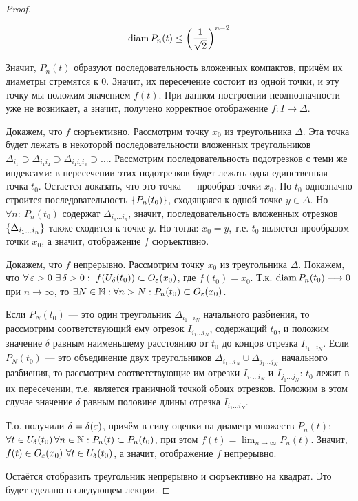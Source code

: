 \begin{proof}
    \begin{statement}
        \[
            \operatorname{diam} P_n(t) \leq \left(\frac{1}{\sqrt{2}}\right)^{n - 2}
        \]
    \end{statement}
    Значит, $P_n(t)$ образуют последовательность вложенных компактов, причём их диаметры стремятся к $0$. Значит, их пересечение состоит из одной точки, и эту точку мы положим значением $f(t)$. При данном построении неоднозначности уже не возникает, а значит, получено корректное отображение $f: I \to \Delta$.

    Докажем, что $f$ сюръективно. 
    Рассмотрим точку $x_0$ из треугольника $\Delta$. Эта точка будет лежать в некоторой последовательности вложенных треугольников $\Delta_{i_1} \supset \Delta_{i_1 i_2} \supset \Delta_{i_1 i_2 i_3} \supset \ldots$. Рассмотрим последовательность подотрезков с теми же индексами: в пересечении этих подотрезков будет лежать одна единственная точка $t_0$. Остается доказать, что это точка --- прообраз точки $x_0$. По $t_0$ однозначно строится последовательность $\left\{P_n(t_0)\right\}$, сходящаяся к одной точке $y \in \Delta$. Но $\forall n: \ P_n(t_0)$ содержат $\Delta_{i_1 \ldots i_n}$, значит, последовательность вложенных отрезков $\left\{\Delta_{i_1 \ldots i_n}\right\}$ также сходится к точке $y$. Но тогда: $x_0 = y$, т.е. $t_0$ является прообразом точки $x_0$, а значит, отображение $f$ сюръективно.

    Докажем, что $f$ непрерывно.
    Рассмотрим точку $x_0$ из треугольника $\Delta$. Покажем, что $\forall \, \veps > 0 \ \exists \, \delta > 0: \ f(U_{\delta}(t_0)) \subset O_{\veps}(x_0)$, где $f(t_0) = x_0$. Т.к. $\operatorname{diam} P_n(t_0) \longrightarrow 0$ при $n \longrightarrow \infty$, то $\exists N \in \mathbb{N}: \forall n > N: P_n(t_0) \subset O_{\varepsilon}(x_0)$.
    
    Если $P_N(t_0)$ --- это один треугольник $\Delta_{i_1 \ldots i_N}$ начального разбиения, то рассмотрим соответствующий ему отрезок $I_{i_1 \ldots i_N}$, содержащий $t_0$, и положим значение $\delta$ равным наименьшему расстоянию от $t_0$ до концов отрезка $I_{i_1 \ldots i_N}$.
    Если $P_N(t_0)$ --- это объединение двух треугольников $\Delta_{i_1 \ldots i_N} \cup \Delta_{j_1 \ldots j_N}$ начального разбиения, то рассмотрим соответствующие им отрезки $I_{i_1 \ldots i_N}$ и $I_{j_1 \ldots j_N}$: $t_0$ лежит в их пересечении, т.е. является граничной точкой обоих отрезков. Положим в этом случае значение $\delta$ равным половине длины отрезка $I_{i_1 \ldots i_N}$.
    
    Т.о. получили $\delta = \delta(\varepsilon)$, причём в силу оценки на диаметр множеств $P_n(t)$: $\forall t \in U_{\delta}(t_0) \, \forall n \in \mathbb{N}: P_n(t) \subset P_n(t_0)$, при этом $f(t) = \lim_{n \to \infty} P_n(t)$. Значит, $f(t) \in O_{\varepsilon}(x_0) \ \forall t \in U_{\delta}(t_0)$, а значит, отображение $f$ непрерывно.

    Остаётся отобразить треугольник непрерывно и сюръективно на квадрат. Это будет сделано в следующем лекции.
\end{proof}

